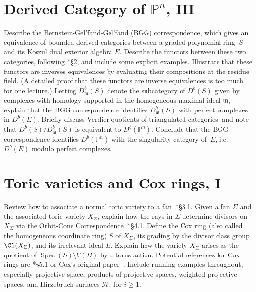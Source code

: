 \documentclass[11pt]{amsart}
\numberwithin{equation}{section}
\theoremstyle{definition}
\theoremstyle{remark}
\newcommand{\m}{\mathfrak m}
\newcommand{\PP}{\mathbb P}
\newcommand{\Spec}{\operatorname{Spec}}
\begin{document}
\section{Derived Category of $\PP^n$, III}
\label{sec:pn3}
Describe the Bernstein-Gel'fand-Gel'fand (BGG) correspondence, which gives an equivalence of bounded derived categories between a graded polynomial ring~$S$ and its Koszul dual exterior algebra $E$. Describe the functors between these two categories, following \cite{EFS}*{\S 2}, and include some explicit examples. Illustrate that these functors are inverses equivalences by evaluating their compositions at the residue field. (A detailed proof that these functors are inverse equivalences is too much for one lecture.) Letting $D^b_\m(S)$ denote the subcategory of $D^b(S)$ given by complexes with homology supported in the homogeneous maximal ideal $\m$, explain that the BGG correspondence identifies $D^b_\m(S)$  with perfect complexes in $D^b(E)$. Briefly discuss Verdier quotients of triangulated categories, and note that $D^b(S) / D^b_\m(S)$ is equivalent to $D^b(\PP^n)$. Conclude that the BGG correspondence identifies $D^b(\PP^n)$ with the singularity category of~$E$, i.e. $D^b(E)$ modulo perfect complexes. 



\section{Toric varieties and Cox rings, I}
Review how to associate a normal toric variety to a fan~\cite{CLS}*{\S 3.1}. Given a fan $\Sigma$ and the associated toric variety $X_\Sigma$, explain how the rays in $\Sigma$ determine divisors on $X_\Sigma$ via the Orbit-Cone Correspondence~\cite{CLS}*{\S 4.1}. Define the Cox ring (also called the homogeneous coordinate ring) $S$ of $X_\Sigma$, its grading by the divisor class group $\Cl(X_\Sigma)$, and its irrelevant ideal $B$. Explain how the variety $X_\Sigma$ arises as the quotient of $\Spec(S) \setminus V(B)$ by a torus action. Potential references for Cox rings are \cite{CLS}*{\S 5.1} or Cox's original paper~\cite{cox}. Include running examples throughout, especially projective space, products of projective spaces, weighted projective spaces, and Hirzebruch surfaces $\mathcal{H}_i$ for $i \ge 1$. 
\end{document}

